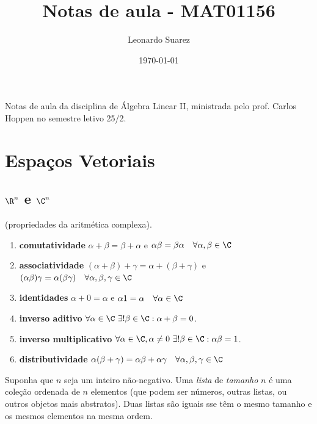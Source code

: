 \documentclass{article}
\title{Notas de aula - MAT01156}
\author{Leonardo Suarez}
\date{\today}
\begin{document}
\maketitle

Notas de aula da disciplina de Álgebra Linear II, ministrada pelo prof. Carlos Hoppen no semestre letivo 25/2.

\tableofcontents

\section{Espaços Vetoriais}

\subsection{\(\R^n\) e \(\C^n\)}
\begin{prop} (propriedades da aritmética complexa).
    \begin{enumerate}
        \item[(a)] \textbf{comutatividade} \(\alpha + \beta = \beta + \alpha\) e \(\alpha \beta = \beta \alpha \quad \forall \alpha, \beta \in \C\)
        \item[(b)] \textbf{associatividade} \((\alpha + \beta) + \gamma = \alpha + (\beta + \gamma)\) e \((\alpha \beta) \gamma = \alpha (\beta \gamma) \quad \forall \alpha, \beta, \gamma \in \C\)
        \item[(c)] \textbf{identidades} \(\alpha + 0 = \alpha\) e \(\alpha 1 = \alpha \quad \forall \alpha \in \C\)
        \item[(d)] \textbf{inverso aditivo} \(\forall \alpha \in \C\ \exists!\beta \in \C: \alpha + \beta = 0\).
        \item[(e)] \textbf{inverso multiplicativo} \(\forall \alpha \in \C, \alpha \neq 0\ \exists! \beta \in \C: \alpha \beta = 1\).
        \item[(f)] \textbf{distributividade} \(\alpha(\beta + \gamma) = \alpha \beta + \alpha \gamma \quad \forall \alpha, \beta, \gamma \in \C\)
    \end{enumerate}
\end{prop}

\begin{defn}
    Suponha que \(n\) seja um inteiro não-negativo. Uma \emph{lista} de \emph{tamanho} \(n\) é uma coleção ordenada de \(n\) elementos (que podem ser números, outras listas, ou outros objetos mais abstratos). Duas listas são iguais sse têm o mesmo tamanho e os mesmos elementos na mesma ordem.
\end{defn}
\end{document}
